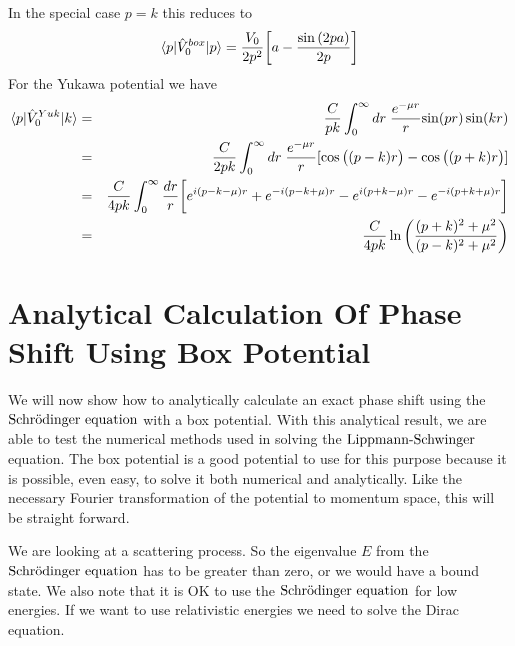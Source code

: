 %
In the special case $p=k$ this reduces to
\begin{eqnarray}\label{eq:boxpotkk}
\braketm{{ p}}{{{\op{V}}_0}^{box}}{{ p}}=\frac{V_0}{2p^2}\bigg[a-\frac{\sin{(2pa)}}{2p}\bigg] 
\end{eqnarray}
\nl
For the Yukawa potential we have
\begin{eqnarray}\label{eq:Yukpotpk}
\braketm{{ p}}{{{\op{V}}_0}^{Yuk}}{{ k}}
&=&
\frac{C}{pk}\int^{\infty}_{0}dr\;\frac{e^{-{ \mu r}}}{{ r}} {\sin (pr)\sin (kr)}\nonumber\\   
&=&
\frac{C}{2pk}\int^{\infty}_{0}dr\;\frac{e^{-{ \mu r}}}{{ r}} [{\cos{\big((p-k)r\big)}-\cos{\big((p+k)r\big)}}]\nonumber\\
&=&
\frac{C}{4pk}\int^{\infty}_{0}\frac{ dr}{{ r}}
\bigg[ e^{i(p-k- \mu) r} +e^{-i(p-k+ \mu) r}-e^{i(p+k- \mu) r}-e^{-i(p+k+ \mu) r}\bigg]\nonumber\\
&=& 
\frac{C}{4pk}\ln\bigg(\frac{(p+k)^2+\mu ^2}{(p-k)^2+\mu^2} \bigg)
\end{eqnarray} 







\section[Analytical Box Potential]{Analytical Calculation Of Phase Shift Using Box Potential}


We will now show how to analytically calculate an exact phase shift using the $\text{Schr$\ddot{\textrm{o}}$dinger equation}$ with a box potential.
With this analytical result, we are able to test the numerical methods used in solving the $\text{Lippmann-Schwinger}$ equation.
The box potential is a good potential to use for this purpose because it is possible, even easy, to solve 
it both numerical and analytically. 
Like the necessary Fourier transformation of the potential to momentum space, this will be straight forward.

We are looking at a scattering process. So the eigenvalue $E$ from the $\text{Schr$\ddot{\textrm{o}}$dinger equation}$ has to be greater than zero,
or we would have a bound state. We also note that it is OK to use the $\text{Schr$\ddot{\textrm{o}}$dinger equation}$ for low energies. If we want
to use relativistic energies we need to solve the Dirac equation.


